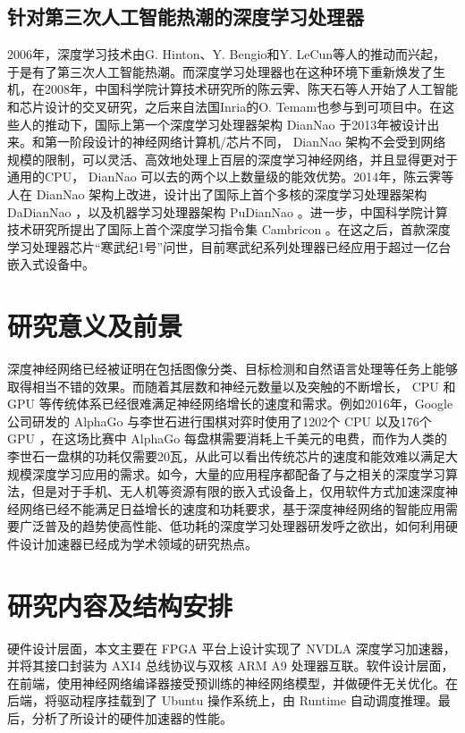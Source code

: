\subsection{针对第三次人工智能热潮的深度学习处理器}
2006年，深度学习技术由G. Hinton、Y. Bengio和Y. LeCun等人的推动而兴起，于是有了第三次人工智能热潮。而深度学习处理器也在这种环境下重新焕发了生机，在2008年，中国科学院计算技术研究所的陈云霁、陈天石等人开始了人工智能和芯片设计的交叉研究，之后来自法国Inria的O. Temam也参与到可项目中。在这些人的推动下，国际上第一个深度学习处理器架构 DianNao 于2013年被设计出来。和第一阶段设计的神经网络计算机/芯片不同， DianNao 架构不会受到网络规模的限制，可以灵活、高效地处理上百层的深度学习神经网络，并且显得更对于通用的CPU， DianNao 可以去的两个以上数量级的能效优势。2014年，陈云霁等人在 DianNao 架构上改进，设计出了国际上首个多核的深度学习处理器架构 DaDianNao ，以及机器学习处理器架构 PuDianNao 。进一步，中国科学院计算技术研究所提出了国际上首个深度学习指令集 Cambricon 。在这之后，首款深度学习处理器芯片“寒武纪1号”问世，目前寒武纪系列处理器已经应用于超过一亿台嵌入式设备中。


\section{研究意义及前景}

深度神经网络已经被证明在包括图像分类、目标检测和自然语言处理等任务上能够取得相当不错的效果。而随着其层数和神经元数量以及突触的不断增长， CPU 和 GPU 等传统体系已经很难满足神经网络增长的速度和需求。例如2016年，Google公司研发的 AlphaGo 与李世石进行围棋对弈时使用了1202个 CPU 以及176个 GPU ，在这场比赛中 AlphaGo 每盘棋需要消耗上千美元的电费，而作为人类的李世石一盘棋的功耗仅需要20瓦，从此可以看出传统芯片的速度和能效难以满足大规模深度学习应用的需求。如今，大量的应用程序都配备了与之相关的深度学习算法，但是对于手机、无人机等资源有限的嵌入式设备上，仅用软件方式加速深度神经网络已经不能满足日益增长的速度和功耗要求，基于深度神经网络的智能应用需要广泛普及的趋势使高性能、低功耗的深度学习处理器研发呼之欲出，如何利用硬件设计加速器已经成为学术领域的研究热点。

\section{研究内容及结构安排}

硬件设计层面，本文主要在 FPGA 平台上设计实现了 NVDLA 深度学习加速器，并将其接口封装为 AXI4 总线协议与双核 ARM A9 处理器互联。软件设计层面，在前端，使用神经网络编译器接受预训练的神经网络模型，并做硬件无关优化。在后端，将驱动程序挂载到了 Ubuntu 操作系统上，由 Runtime 自动调度推理。最后，分析了所设计的硬件加速器的性能。

